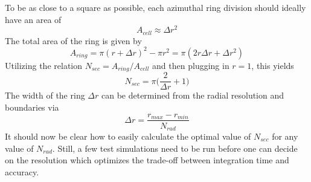     To be as close to a square as possible, each azimuthal ring division should 
    ideally have an area of 
    \begin{equation}
      A_{cell}\approx\Delta r^2
    \end{equation}
    The total area of the ring is given by 
    \begin{equation}
      A_{ring}=\pi(r+\Delta r)^2-\pi r^2=\pi(2r\Delta r+\Delta r^2)
    \end{equation}
    Utilizing the relation $N_{sec}=A_{ring}/A_{cell}$ and then plugging 
    in $r=1$, this yields
    \begin{equation}
      N_{sec}=\pi\bigg(\frac{2}{\Delta r}+1\bigg)
      \label{eq:azimuthal resolution from radial resolution and boundaries}
    \end{equation}
    The width of the ring $\Delta r$ can be determined from the 
    radial resolution and boundaries via
    \begin{equation}
      \Delta r=\frac{r_{max}-r_{min}}{N_{rad}}
      \label{eq:delta_r_from_bounds_and_n_rad}
    \end{equation}
    It should now be clear how to easily calculate the optimal value of 
    $N_{sec}$ for any value of $N_{rad}$. 
    Still, a few test simulations need 
    to be run before one can decide on the resolution which optimizes the 
    trade-off between integration time and accuracy. 

